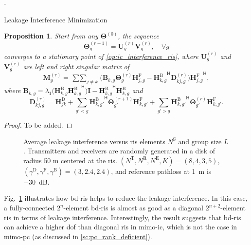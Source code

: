 \documentclass[journal]{IEEEtran}
\newtheorem{proposition}{Proposition}
\begin{document}
\begin{section}{-}
\begin{subsection}{Leakage Interference Minimization}
		\begin{proposition}
			Start from any $\mathbf{\Theta}^{(0)}$, the sequence
			\begin{equation}
				\mathbf{\Theta}_g^{(r+1)} = \mathbf{U}_g^{(r)} \mathbf{V}_g^{(r)}, \quad \forall g
			\end{equation}
			converges to a stationary point of \eqref{op:ic_interference_ris}, where $\mathbf{U}_g^{(r)}$ and $\mathbf{V}_g^{(r)}$ are left and right singular matrix of
			\begin{equation}
				\mathbf{M}_g^{(r)} = \mathop{\sum\sum}_{j \neq k} \bigl(\mathbf{B}_{k,g} \mathbf{\Theta}_g^{(r)} \mathbf{H}_{j,g}^\mathrm{F} - {\mathbf{H}_{k,g}^\mathrm{B}}^\mathsf{H} \mathbf{D}_{kj,g}^{(r)}\bigr) {\mathbf{H}_{j,g}^\mathrm{F}}^\mathsf{H},
			\end{equation}
			where $\mathbf{B}_{k,g} = \lambda_1\bigl(\mathbf{H}_{k,g}^\mathrm{B} {\mathbf{H}_{k,g}^\mathrm{B}}^\mathsf{H}\bigr) \mathbf{I} - {\mathbf{H}_{k,g}^\mathrm{B}}^\mathsf{H} \mathbf{H}_{k,g}^\mathrm{B}$ and
			\begin{equation}
				\mathbf{D}_{kj,g}^{(r)} = \mathbf{H}_{jk}^\mathrm{D} + \sum_{g'<g} {\mathbf{H}_{k,g'}^\mathrm{B}}^\mathsf{H} \mathbf{\Theta}_{g'}^{(r+1)} \mathbf{H}_{k,g'}^\mathrm{F} + \sum_{g'>g} {\mathbf{H}_{k,g'}^\mathrm{B}}^\mathsf{H} \mathbf{\Theta}_{g'}^{(r)} \mathbf{H}_{k,g'}^\mathrm{F}.
			\end{equation}
		\end{proposition}
		\begin{proof}
			To be added.
		\end{proof}

		\begin{figure}[!t]
			\centering
			\resizebox{0.65\columnwidth}{!}{
				
			}
			\caption{Average leakage interference versus \gls{ris} elements $N^\mathrm{S}$ and group size $L$. Transmitters and receivers are randomly generated in a disk of radius 50 m centered at the \gls{ris}. $(N^\mathrm{T}, N^\mathrm{R}, N^\mathrm{E}, K) = (8, 4, 3, 5)$, $(\gamma^\mathrm{D}, \gamma^\mathrm{F}, \gamma^\mathrm{B}) = (3, 2.4, 2.4)$, and reference pathloss at \qty{1}{\meter} is \qty{-30}{\dB}.}
			\label{sm:ic_interference_sx}
		\end{figure}
		Fig.~\ref{sm:ic_interference_sx} illustrates how \gls{bd}-\gls{ris} helps to reduce the leakage interference.
		In this case, a fully-connected $2^n$-element \gls{bd}-\gls{ris} is almost as good as a diagonal $2^{n+2}$-element \gls{ris} in terms of leakage interference.
		Interestingly, the result suggests that \gls{bd}-\gls{ris} can achieve a higher \gls{dof} than diagonal \gls{ris} in \gls{mimo}-\gls{ic}, which is not the case in \gls{mimo}-\gls{pc} (as discussed in \ref{sc:pc_rank_deficient}).
	\end{subsection}


\end{section}
\end{document}
